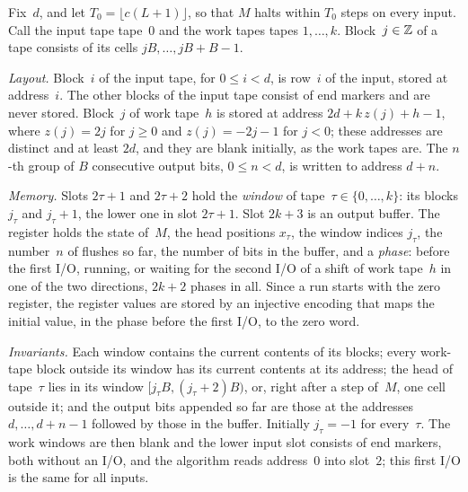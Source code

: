 \begin{outline}
Fix~$d$, and let $T_0=\lfloor c(L+1)\rfloor$, so that $M$ halts within $T_0$ steps on every input. Call the input tape
tape~$0$ and the work tapes tapes $1,\dots,k$. Block~$j\in\mathbb{Z}$ of a tape consists of its cells $jB,\dots,jB+B-1$.

\emph{Layout.} Block~$i$ of the input tape, for $0\le i<d$, is row~$i$ of the input, stored at address~$i$. The other
blocks of the input tape consist of end markers and are never stored. Block~$j$ of work tape~$h$ is stored at address
$2d+k\,z(j)+h-1$, where $z(j)=2j$ for $j\ge0$ and $z(j)=-2j-1$ for $j<0$; these addresses are distinct and at least
$2d$, and they are blank initially, as the work tapes are. The $n$-th group of $B$ consecutive output bits, $0\le n<d$, is
written to address $d+n$.

\emph{Memory.} Slots $2\tau+1$ and $2\tau+2$ hold the \emph{window} of tape~$\tau\in\{0,\dots,k\}$: its blocks $j_\tau$
and $j_\tau+1$, the lower one in slot $2\tau+1$. Slot $2k+3$ is an output buffer. The register holds the state of~$M$, the
head positions $x_\tau$, the window indices $j_\tau$, the number~$n$ of flushes so far, the number of bits in the buffer,
and a \emph{phase}: before the first I/O, running, or waiting for the second I/O of a shift of work tape~$h$ in one of
the two directions, $2k+2$ phases in all. Since a run starts with the zero register, the register values are stored by
an injective encoding that maps the initial value, in the phase before the first I/O, to the zero word.

\emph{Invariants.} Each window contains the current contents of its blocks; every work-tape block outside its window has
its current contents at its address; the head of tape~$\tau$ lies in its window $[j_\tau B,(j_\tau+2)B)$, or, right
after a step of~$M$, one cell outside it; and the output bits appended so far are those at the addresses
$d,\dots,d+n-1$ followed by those in the buffer. Initially $j_\tau=-1$ for every~$\tau$. The work windows are then blank
and the lower input slot consists of end markers, both without an I/O, and the algorithm reads address~$0$ into
slot~$2$; this first I/O is the same for all inputs.


\end{outline}
